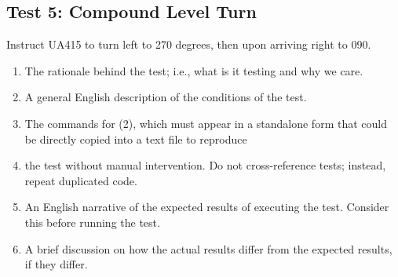 \documentclass[letterpaper, 12pt]{article}
\begin{document}
\subsection{Test 5: Compound Level Turn}
Instruct UA415 to turn left to 270 degrees, then upon arriving right to 090.
\begin{enumerate}
\item The rationale behind the test; i.e., what is it testing and why we care.
\item A general English description of the conditions of the test.
\item The commands for (2), which must appear in a standalone form that could be directly copied into a text file to reproduce
\item the test without manual intervention. Do not cross-reference tests; instead, repeat duplicated code.
\item An English narrative of the expected results of executing the test. Consider this before running the test.
\item A brief discussion on how the actual results differ from the expected results, if they differ.
\end{enumerate}
\end{document}
